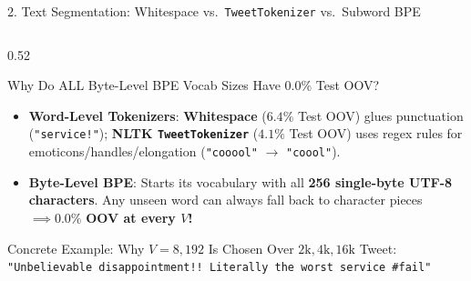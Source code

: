 \documentclass[aspectratio=169, 9pt]{beamer}
\begin{document}
\begin{frame}{2. Text Segmentation: Whitespace vs.\ \texttt{TweetTokenizer} vs.\ Subword BPE}
\vspace{-2mm}
\begin{columns}[T, onlytextwidth]
  \begin{column}{0.52\textwidth}
    \begin{block}{Why Do ALL Byte-Level BPE Vocab Sizes Have $0.0\%$ Test OOV?}
      \scriptsize
      \begin{itemize}\setlength{\itemsep}{1pt}
        \item \textbf{Word-Level Tokenizers}: \textbf{Whitespace} ($6.4\%$ Test OOV) glues punctuation (\texttt{"service!"}); \textbf{NLTK \texttt{TweetTokenizer}} ($4.1\%$ Test OOV) uses regex rules for emoticons/handles/elongation (\texttt{"cooool"} $\to$ \texttt{"coool"}).
        \item \textbf{Byte-Level BPE}: Starts its vocabulary with all \textbf{256 single-byte UTF-8 characters}. Any unseen word can always fall back to character pieces $\implies \mathbf{0.0\%}$ \textbf{OOV at every $V$!}
      \end{itemize}
    \end{block}
    \vspace{-2mm}
    \begin{exampleblock}{Concrete Example: Why $V = 8,192$ Is Chosen Over $2\text{k}, 4\text{k}, 16\text{k}$}
      \scriptsize
      Tweet: \texttt{"Unbelievable disappointment!! Literally the worst service \#fail"}\\[1pt]
      \renewcommand{\arraystretch}{1.05}
\end{exampleblock}
\end{column}
\end{columns}
\end{frame}
\end{document}
